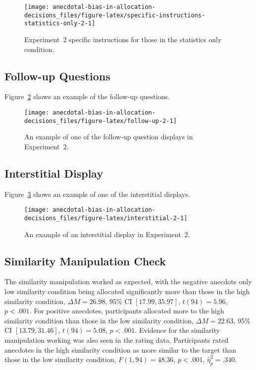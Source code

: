 \documentclass[
  man, donotrepeattitle,floatsintext]{apa7}
\theoremstyle{definition}
\theoremstyle{definition}
\theoremstyle{definition}
\theoremstyle{definition}
\theoremstyle{remark}
\begin{document}
\begin{figure}
\texttt{[image: anecdotal-bias-in-allocation-decisions\_files/figure-latex/specific-instructions-statistics-only-2-1]} \caption{Experiment~2 specific instructions for those in the statistics only condition.}\label{fig:specific-instructions-statistics-only-2}
\end{figure}

\hypertarget{follow-up-materials-2}{%
\subsection{Follow-up Questions}\label{follow-up-materials-2}}

Figure~\ref{fig:follow-up-2} shows an example of the
follow-up questions.



\begin{figure}
\texttt{[image: anecdotal-bias-in-allocation-decisions\_files/figure-latex/follow-up-2-1]} \caption{An example of one of the follow-up question displays in Experiment~2.}\label{fig:follow-up-2}
\end{figure}

\hypertarget{interstitial-materials-2}{%
\subsection{Interstitial Display}\label{interstitial-materials-2}}

Figure~\ref{fig:interstitial-2} shows an example of one of
the interstitial displays.



\begin{figure}
\texttt{[image: anecdotal-bias-in-allocation-decisions\_files/figure-latex/interstitial-2-1]} \caption{An example of an interstitial display in Experiment~2.}\label{fig:interstitial-2}
\end{figure}

\hypertarget{results-2-appendix}{%
\subsection{Similarity Manipulation Check}\label{results-2-appendix}}

The similarity manipulation worked as expected, with the negative anecdote only
low similarity condition being allocated significantly more than those in the
high similarity condition,
\(\Delta M = 26.98\), 95\% CI \([17.99, 35.97]\), \(t(94) = 5.96\), \(p < .001\). For
positive anecdotes, participants allocated more to the high similarity condition
than those in the low similarity condition,
\(\Delta M = 22.63\), 95\% CI \([13.79, 31.46]\), \(t(94) = 5.08\), \(p < .001\). Evidence
for the similarity manipulation working was also seen in the rating data.
Participants rated anecdotes in the high similarity condition as more similar to
the target than those in the low similarity condition,
\(F(1, 94) = 48.36\), \(p < .001\), \(\hat{\eta}^2_p = .340\).
\end{document}
